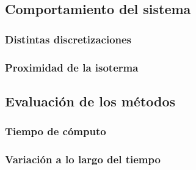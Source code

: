 \subsection{Comportamiento del sistema}

\subsubsection{Distintas discretizaciones}

\subsubsection{Proximidad de la isoterma}

\subsection{Evaluación de los métodos}

\subsubsection{Tiempo de cómputo}

\subsubsection{Variación a lo largo del tiempo}
